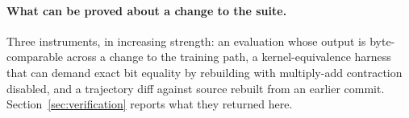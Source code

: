 \paragraph{What can be proved about a change to the suite.}
Three instruments, in increasing strength: an evaluation whose output is
byte-comparable across a change to the training path, a kernel-equivalence harness
that can demand exact bit equality by rebuilding with multiply-add contraction
disabled, and a trajectory diff against source rebuilt from an earlier commit.
Section~\ref{sec:verification} reports what they returned here.

